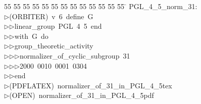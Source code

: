 %
%
\begin{tabbing}
55 \= 55 \= 55 \= 55 \= 55 \= 55 \= 55 \= 55 \= 55 \= 55 \= 55 \= 55 \= 55 \= \kill
PGL\_4\_5\_norm\_31:\\[0pt]
$\triangleright$\>(ORBITER)\ v\ 6\ define\ G\ \\[0pt]
$\triangleright$\>$\triangleright$\>linear\_group\ PGL\ 4\ 5\ end\ \\[0pt]
$\triangleright$\>$\triangleright$\>with\ G\ do\ \\[0pt]
$\triangleright$\>$\triangleright$\>group\_theoretic\_activity\ \\[0pt]
$\triangleright$\>$\triangleright$\>$\triangleright$\>normalizer\_of\_cyclic\_subgroup\ 31\ \\[0pt]
$\triangleright$\>$\triangleright$\>$\triangleright$\>2000\ 0010\ 0001\ 0304\\[0pt]
$\triangleright$\>$\triangleright$\>end\\[0pt]
$\triangleright$\>(PDFLATEX)\ normalizer\_of\_31\_in\_PGL\_4\_5tex\\[0pt]
$\triangleright$\>(OPEN)\ normalizer\_of\_31\_in\_PGL\_4\_5pdf\\[0pt]
\end{tabbing}
